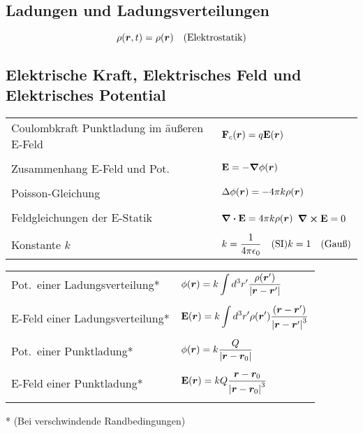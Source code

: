 \subsection{Ladungen und Ladungsverteilungen}%
\begin{equation*}
  \rho(\vb*r, t) = \rho(\vb*r) \quad (\text{Elektrostatik})
\end{equation*}

\subsection{Elektrische Kraft, Elektrisches Feld und Elektrisches Potential}%
\begin{multicols}{2}
  \noindent
  \begin{tabular}{p{4.5cm}p{5cm}}
    Coulombkraft Punktladung im äußeren E-Feld
    & 
    $\displaystyle \vb F_c(\vb*r) = q\vb E(\vb*r)$ 
    \\\\
    Zusammenhang E-Feld und Pot.
    &
    $\displaystyle \vb E = -\grad\phi(\vb*r)$
    \\\\
    Poisson-Gleichung
    & 
    \(\displaystyle
      \Delta\phi(\vb*r) = -4\pi k \rho(\vb*r)
    \)\\\\
    Feldgleichungen der E-Statik
    & 
    \(\displaystyle
    \div\vb E = 4\pi k \rho(\vb*r)
    \)\newline
    \(\displaystyle
      \curl\vb E = 0
    \) \\\\
    Konstante $k$
    &
    \(\displaystyle
      k=\frac{1}{4\pi \epsilon_0}\quad (\text{SI}) \newline
      k=1\quad (\text{Gauß})
    \)
  \end{tabular}
  
  \noindent
  \begin{tabular}{p{3cm}p{5cm}}
    Pot.\ einer Ladungsverteilung*
    &
    \(\displaystyle
      \phi(\vb*r)=k\int d^3r' \frac{\rho(\vb*r')}{\abs{\vb*r-\vb*r'}}
    \)
    \\\\
    E-Feld einer Ladungsverteilung*
    &
    \(\displaystyle
        \vb E(\vb*r)=k\int d^3r' \rho(\vb*r')\frac{(\vb*r-\vb*r')}{\abs{\vb*r-\vb*r'}^3}
    \)\\\\
    Pot.\ einer Punktladung*
    &
    \(\displaystyle
    \phi(\vb*r) = k \frac{Q}{\abs{\vb*r-\vb*r_0}} 
    \)\\\\
    E-Feld einer Punktladung*
    &
    \(\displaystyle
    \vb E(\vb*r) = kQ \frac{\vb*r-\vb*r_0}{\abs{\vb*r-\vb*r_0}^3} 
    \)\\\\
  \end{tabular}
  * (Bei verschwindende Randbedingungen)
\end{multicols}
